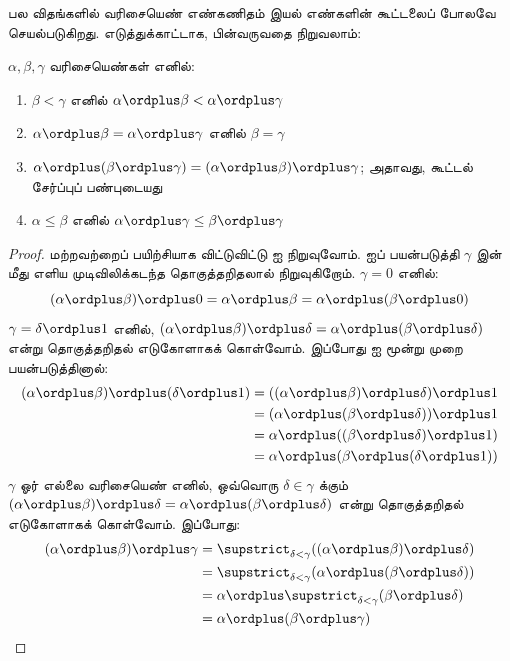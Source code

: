 \documentclass[../../../include/open-logic-section]{subfiles}
\begin{document}
பல விதங்களில் வரிசையெண் எண்கணிதம் இயல் எண்களின் கூட்டலைப் போலவே
செயல்படுகிறது. எடுத்துக்காட்டாக, பின்வருவதை நிறுவலாம்:

\begin{lem}
$\alpha, \beta, \gamma$ வரிசையெண்கள் எனில்:
\begin{enumerate}
  \item{} $\beta < \gamma$ எனில்
  $\alpha \ordplus  \beta < \alpha \ordplus  \gamma$
  \item{}
  $\alpha \ordplus  \beta = \alpha\ordplus \gamma$ எனில்
  $\beta = \gamma$
  \item{}
  $\alpha \ordplus  (\beta \ordplus \gamma) =
  (\alpha \ordplus  \beta) \ordplus  \gamma$; அதாவது,
  கூட்டல் சேர்ப்புப் பண்புடையது
  \item{} $\alpha \leq \beta$ எனில்
  $\alpha \ordplus  \gamma \leq \beta \ordplus \gamma$
\end{enumerate}
\end{lem}

\begin{proof}
மற்றவற்றைப் பயிற்சியாக விட்டுவிட்டு  ஐ
நிறுவுவோம்.  ஐப் பயன்படுத்தி
$\gamma$ இன் மீது எளிய முடிவிலிக்கடந்த தொகுத்தறிதலால் நிறுவுகிறோம்.
$\gamma = 0$ எனில்:
\[
(\alpha \ordplus  \beta) \ordplus  0 = \alpha \ordplus  \beta  = \alpha \ordplus  (\beta \ordplus  0)
\]
$\gamma = \delta\ordplus 1$ எனில்,
$(\alpha \ordplus  \beta) \ordplus  \delta =
\alpha \ordplus  (\beta \ordplus \delta)$ என்று தொகுத்தறிதல்
எடுகோளாகக் கொள்வோம். இப்போது  ஐ
மூன்று முறை பயன்படுத்தினால்:
\begin{align*}
  (\alpha \ordplus  \beta) \ordplus  (\delta \ordplus  1) & = ((\alpha \ordplus  \beta) \ordplus  \delta)\ordplus 1\\
  & = (\alpha \ordplus  (\beta \ordplus  \delta)) \ordplus  1\\
  & = \alpha \ordplus  ((\beta \ordplus  \delta)\ordplus 1)\\
  & = \alpha \ordplus  (\beta \ordplus  (\delta\ordplus 1))
\end{align*}
$\gamma$ ஓர் எல்லை வரிசையெண் எனில், ஒவ்வொரு
$\delta \in \gamma$ க்கும்
$(\alpha \ordplus  \beta) \ordplus  \delta =
\alpha \ordplus  (\beta \ordplus  \delta)$ என்று
தொகுத்தறிதல் எடுகோளாகக் கொள்வோம். இப்போது:
\begin{align*}
  (\alpha \ordplus  \beta) \ordplus  \gamma & = \supstrict_{\delta < \gamma}((\alpha \ordplus  \beta) \ordplus  \delta) \\
  &= \supstrict_{\delta < \gamma}(\alpha \ordplus  (\beta \ordplus  \delta))\\
  &= \alpha \ordplus  \supstrict_{\delta < \gamma}(\beta \ordplus  \delta)\\
  &= \alpha \ordplus  (\beta \ordplus  \gamma)
\end{align*}
\end{proof}
\end{document}
